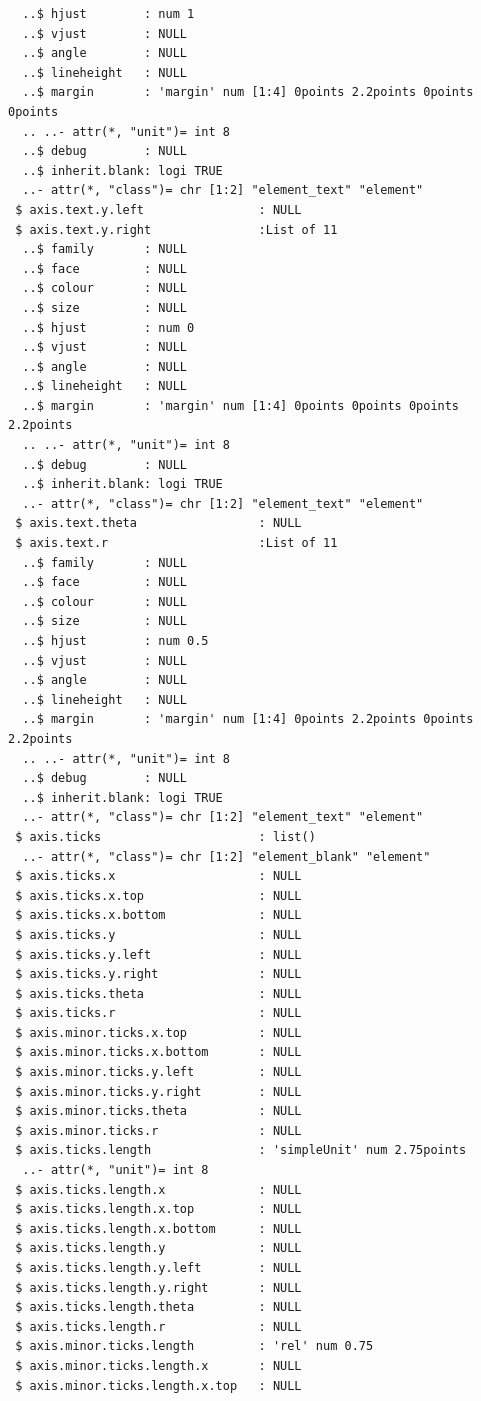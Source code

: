 \documentclass[
  letterpaper,
  DIV=11,
  numbers=noendperiod]{scrartcl}
\begin{document}
\begin{verbatim}
  ..$ hjust        : num 1
  ..$ vjust        : NULL
  ..$ angle        : NULL
  ..$ lineheight   : NULL
  ..$ margin       : 'margin' num [1:4] 0points 2.2points 0points 0points
  .. ..- attr(*, "unit")= int 8
  ..$ debug        : NULL
  ..$ inherit.blank: logi TRUE
  ..- attr(*, "class")= chr [1:2] "element_text" "element"
 $ axis.text.y.left                : NULL
 $ axis.text.y.right               :List of 11
  ..$ family       : NULL
  ..$ face         : NULL
  ..$ colour       : NULL
  ..$ size         : NULL
  ..$ hjust        : num 0
  ..$ vjust        : NULL
  ..$ angle        : NULL
  ..$ lineheight   : NULL
  ..$ margin       : 'margin' num [1:4] 0points 0points 0points 2.2points
  .. ..- attr(*, "unit")= int 8
  ..$ debug        : NULL
  ..$ inherit.blank: logi TRUE
  ..- attr(*, "class")= chr [1:2] "element_text" "element"
 $ axis.text.theta                 : NULL
 $ axis.text.r                     :List of 11
  ..$ family       : NULL
  ..$ face         : NULL
  ..$ colour       : NULL
  ..$ size         : NULL
  ..$ hjust        : num 0.5
  ..$ vjust        : NULL
  ..$ angle        : NULL
  ..$ lineheight   : NULL
  ..$ margin       : 'margin' num [1:4] 0points 2.2points 0points 2.2points
  .. ..- attr(*, "unit")= int 8
  ..$ debug        : NULL
  ..$ inherit.blank: logi TRUE
  ..- attr(*, "class")= chr [1:2] "element_text" "element"
 $ axis.ticks                      : list()
  ..- attr(*, "class")= chr [1:2] "element_blank" "element"
 $ axis.ticks.x                    : NULL
 $ axis.ticks.x.top                : NULL
 $ axis.ticks.x.bottom             : NULL
 $ axis.ticks.y                    : NULL
 $ axis.ticks.y.left               : NULL
 $ axis.ticks.y.right              : NULL
 $ axis.ticks.theta                : NULL
 $ axis.ticks.r                    : NULL
 $ axis.minor.ticks.x.top          : NULL
 $ axis.minor.ticks.x.bottom       : NULL
 $ axis.minor.ticks.y.left         : NULL
 $ axis.minor.ticks.y.right        : NULL
 $ axis.minor.ticks.theta          : NULL
 $ axis.minor.ticks.r              : NULL
 $ axis.ticks.length               : 'simpleUnit' num 2.75points
  ..- attr(*, "unit")= int 8
 $ axis.ticks.length.x             : NULL
 $ axis.ticks.length.x.top         : NULL
 $ axis.ticks.length.x.bottom      : NULL
 $ axis.ticks.length.y             : NULL
 $ axis.ticks.length.y.left        : NULL
 $ axis.ticks.length.y.right       : NULL
 $ axis.ticks.length.theta         : NULL
 $ axis.ticks.length.r             : NULL
 $ axis.minor.ticks.length         : 'rel' num 0.75
 $ axis.minor.ticks.length.x       : NULL
 $ axis.minor.ticks.length.x.top   : NULL

\end{verbatim}
\end{document}
